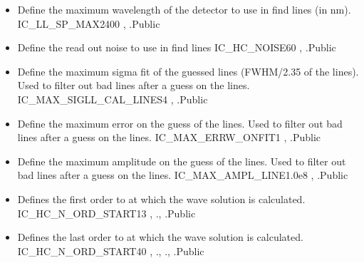 \begin{itemize}
\item {} 
{Define the maximum wavelength of the detector to use in find lines (in nm).}
{IC\_LL\_SP\_MAX}{2400}
{\calHC, \calWAVE}{\constantsfile}{\spirouTHORCA.}{Public}

\item {} 
{Define the read out noise to use in find lines}
{IC\_HC\_NOISE}{60}
{\calHC, \calWAVE}{\constantsfile}{\spirouTHORCA.}{Public}

\item {} 
{Define the maximum sigma fit of the guessed lines (FWHM/2.35 of the lines). Used to filter out bad lines after a guess on the lines.}
{IC\_MAX\_SIGLL\_CAL\_LINES}{4}
{\calHC, \calWAVE}{\constantsfile}{\spirouTHORCA.}{Public}

\item {} 
{Define the maximum error on the guess of the lines. Used to filter out bad lines after a guess on the lines.}
{IC\_MAX\_ERRW\_ONFIT}{1}
{\calHC, \calWAVE}{\constantsfile}{\spirouTHORCA.}{Public}

\item {} 
{Define the maximum amplitude on the guess of the lines. Used to filter out bad lines after a guess on the lines.}
{IC\_MAX\_AMPL\_LINE}{1.0e8}
{\calHC, \calWAVE}{\constantsfile}{\spirouTHORCA.}{Public}

\item {} 
{Defines the first order to at which the wave solution is calculated.}
{IC\_HC\_N\_ORD\_START}{13}
{\calHC, \calWAVE}{\constantsfile}{\spirouTHORCA., \spirouTHORCA.}{Public}

\item {} 
{Defines the last order to at which the wave solution is calculated.}
{IC\_HC\_N\_ORD\_START}{40}
{\calHC, \calWAVE}{\constantsfile}{\spirouTHORCA., \spirouTHORCA., \spirouWAVE.}{Public}


\end{itemize}
